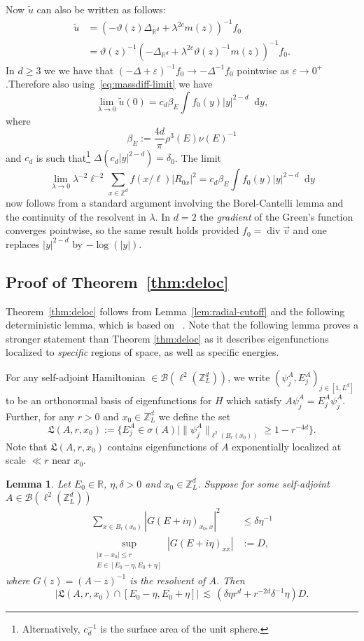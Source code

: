 \documentclass[11pt]{amsart}
\def\Real{{\mathbb R}}
\def\R{{\mathbb{R}}}
\def\bbZ{{\mathbb Z}}
\def\eps{{\varepsilon}}
\DeclareMathOperator{\Div}{div}
\newcommand{\diff}{\mathop{}\!\mathrm{d}}
\def\lsim{{\,\lesssim\,}}
\numberwithin{equation}{section}
\numberwithin{theorem}{section}
\newtheorem{lemma}[theorem]{Lemma}
\begin{document}
Now $\tilde{u}$ can also be written as follows:
\begin{align*}
\tilde{u}
&= (-\vartheta(z) \Delta_{\Real^d} + \lambda^{2c} m(z))^{-1}f_0 \\
&= \vartheta(z)^{-1}(- \Delta_{\Real^d} + \lambda^{2c}\vartheta(z)^{-1} m(z))^{-1}f_0.
\end{align*}
In $d\geq 3$ we we have that $(-\Delta + \eps)^{-1}f_0 \to -\Delta^{-1} f_0$ pointwise as $\eps\to 0^+$.Therefore also
using~\eqref{eq:massdiff-limit} we have
\[
\lim_{\lambda \to 0} \tilde{u}(0) = c_d \beta_E \int f_0(y) |y|^{2-d}\diff y,
\]
where
\[
\beta_E := \frac{4d}{\pi}\rho^3(E) \nu(E)^{-1}
\]
and $c_d$ is such that\footnote{Alternatively, $c_d^{-1}$ is the surface area of the unit sphere.} $\Delta (c_d|y|^{2-d}) = \delta_0$.  The limit
\[
\lim_{\lambda\to 0} \lambda^{-2} \ell^{-2}
\sum_{x\in\bbZ^d}f(x/\ell) |R_{0x}|^2
= c_d \beta_E \int f_0(y) |y|^{2-d}\diff y
\]
now follows from a standard argument involving the Borel-Cantelli lemma and the continuity of the resolvent in $\lambda$.
In $d=2$ the \textit{gradient} of the Green's function converges pointwise, so the same result holds
provided $f_0=\Div \vec{v}$ and one replaces $|y|^{2-d}$ by $-\log(|y|)$.


\subsection{Proof of Theorem~\ref{thm:deloc}}
\label{sec:deloc-pf}
Theorem~\ref{thm:deloc} follows from Lemma~\ref{lem:radial-cutoff} and the following
deterministic lemma, which is based on ~\cite[Proposition 7.1]{Y3Teq}. Note that the following lemma proves a stronger statement than Theorem \ref{thm:deloc}
as it describes eigenfunctions localized to \textit{specific} regions of space,
as well as specific energies.

For any self-adjoint Hamiltonian $\in \mathcal{B}(\ell^2(\mathbb{Z}^d_L))$, we write
$(\psi_j^A,E_j^A)_{j\in[1,L^d]}$ to be an orthonormal basis of eigenfunctions for $H$ which satisfy $A\psi_j^A = E_j^A\psi_j^A$.
Further, for any $r>0$ and $x_0\in \mathbb{Z}^d_L$
we define the set
\[
\mathfrak{L}(A,r,x_0) := \{E_j^A \in \sigma(A) \mid
\|\psi_{j}^A \|_{\ell^2 (B_{r}(x_0))} \geq 1- r^{-4d}\}.
\]
Note that $\mathfrak{L}(A,r,x_0)$ contains eigenfunctions of
$A$ exponentially localized at scale $\ll r$ near $x_0$.

\begin{lemma}
\label{lem:deterministic-localization-length}
Let $E_0\in \R$, $\eta,\delta>0$ and $x_0\in \mathbb{Z}^d_L$. Suppose for some self-adjoint $A\in \mathcal{B}(\ell^2(\mathbb{Z}^d_L))$
\begin{align*}
\sum_{x\in B_r(x_0)}|G(E+i\eta)_{x_0,x}|^2 &\leq \delta \eta^{-1} \\
\sup_{\substack{|x-x_0|\leq r\\E\in [E_0-\eta,E_0+\eta]}}|G(E+i\eta)_{xx}| &:= D,
\end{align*}
where $G(z)=(A-z)^{-1}$ is the resolvent of $A$.
Then
\[
|\mathfrak{L}(A,r,x_0) \cap [E_0-\eta,E_0+\eta]| \lsim (\delta \eta r^d + r^{-2d}\delta^{-1} \eta) D.
\]
\end{lemma}
\end{document}
